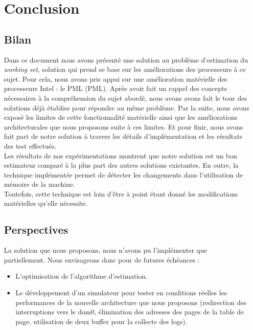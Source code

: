 \let\textcircled=\pgftextcircled
\chapter*{Conclusion}
\label{chap:conclusion}

\section*{Bilan}
Dans ce document nous avons présenté une solution au problème d'estimation du \textit{working set}, solution qui prend se base sur les améliorations des processeurs à ce sujet. Pour cela, nous avons pris appui sur une amélioration matérielle des processeurs Intel : le PML (\acl{PML}). Après avoir fait un rappel des concepts nécessaires à la compréhension du sujet abordé, nous avons avons fait le tour des solutions déjà établies pour répondre au même problème. Par la suite, nous avons exposé les limites de cette fonctionnalité matérielle ainsi que les améliorations architecturales que nous proposons suite à ces limites. Et pour finir, nous avons fait part de notre solution à travers les détails d'implémentation et les résultats des test effectués.\\
Les résultats de nos expérimentations montrent que notre solution est un bon estimateur comparé à la plus part des autres solutions existantes. En outre, la technique implémentée permet de détecter les changements dans l'utilisation de mémoire de la machine.\\
Toutefois, cette technique est loin d'être à point étant donné les modifications matérielles qu'elle nécessite.

\section*{Perspectives}
La solution que nous proposons, nous n'avons pu l'implémenter que partiellement. Nous envisageons donc pour de futures échéances :
\begin{itemize}[label=]
    \item L'optimisation de l'algorithme d'estimation.
    \item Le développement d'un simulateur pour tester en conditions réelles les performances de la nouvelle architecture que nous proposons (redirection des interruptions vers le dom0, élimination des adresses des pages de la table de page, utilisation de deux buffer pour la collecte des logs).
\end{itemize}
